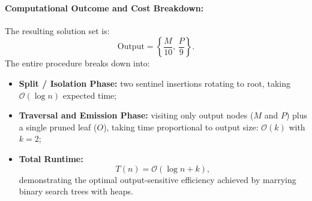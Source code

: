 \paragraph{Computational Outcome and Cost Breakdown:}
The resulting solution set is:
\begin{equation}
  \text{Output} = \left\{ \frac{M}{10}, \, \frac{P}{9} \right\}.
\end{equation}
The entire procedure breaks down into:
\begin{itemize}
    \item \textbf{Split / Isolation Phase:} two sentinel insertions rotating to root, taking $\mathcal{O}(\log n)$ expected time;
    \item \textbf{Traversal and Emission Phase:} visiting only output nodes ($M$ and $P$) plus a single pruned leaf ($O$), taking time proportional to output size: $\mathcal{O}(k)$ with $k = 2$;
    \item \textbf{Total Runtime:}
    \begin{equation}
      T(n) = \mathcal{O}(\log n + k),
    \end{equation}
    demonstrating the optimal output-sensitive efficiency achieved by marrying binary search trees with heaps.
\end{itemize}



